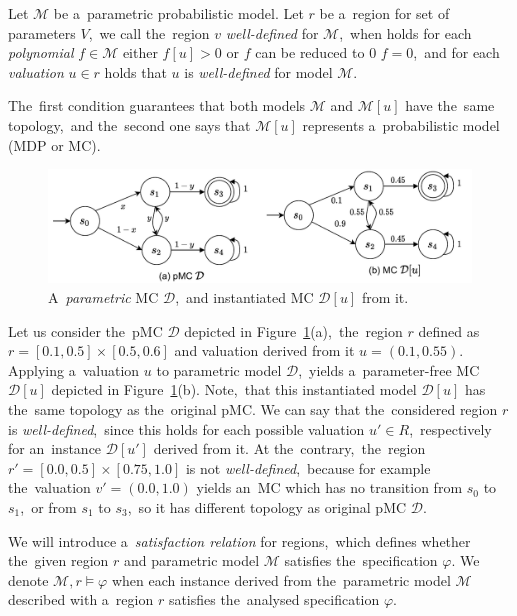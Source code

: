 \begin{definition}
Let $\mathcal{M}$ be a~parametric probabilistic model.
Let $r$ be a~region for set of parameters $V$,~we call the~region $v$ \textit{well-defined} for $\mathcal{M}$,~when holds for each \textit{polynomial} $f \in \mathcal{M}$ either $f[u] > 0$ or  $f$ can be reduced to 0 $f = 0$,~and for each \textit{valuation} $u \in r$ holds that $u$ is \textit{well-defined} for model $\mathcal{M}$.
\end{definition}
\noindent
The~first condition guarantees that both models $\mathcal{M}$ and $\mathcal{M}[u]$ have the~same topology,~and the~second one says that $\mathcal{M}[u]$ represents a~probabilistic model (MDP or MC).

\begin{figure}[h!]
\centering
\includegraphics[width=1.0\textwidth]{figures/param_instance.pdf}
\caption{A~\textit{parametric} MC $\mathcal{D}$,~and instantiated MC $\mathcal{D}[u]$ from it.}%
\label{fig:param_instance}%
\end{figure}

\begin{example}[Region]
Let us consider the~pMC $\mathcal{D}$ depicted in Figure~\ref{fig:param_instance}(a),~the~region $r$ defined as $r = [0.1, 0.5] \times [0.5, 0.6]$ and valuation derived from it $u = (0.1, 0.55)$.
Applying a~valuation $u$ to parametric model $\mathcal{D}$,~yields a~parameter-free MC $\mathcal{D}[u]$ depicted in Figure~\ref{fig:param_instance}(b).
Note,~that this instantiated model $\mathcal{D}[u]$ has the~same topology as the~original pMC.
We can say that the~considered region $r$ is \textit{well-defined},~since this holds for each possible valuation $u' \in R$,~respectively for an~instance $\mathcal{D}[u']$ derived from it.
At the~contrary,~the~region $r' = [0.0, 0.5] \times [0.75, 1.0]$ is not \textit{well-defined},~because for example the~valuation $v' = (0.0, 1.0)$ yields an~MC which has no transition from $s_0$ to $s_1$,~or from $s_1$ to $s_3$,~so it has different topology as original pMC $\mathcal{D}$.
\end{example}

We will introduce a~\textit{satisfaction relation} for regions,~which defines whether the~given region $r$ and parametric model $\mathcal{M}$ satisfies the~specification $\varphi$.
We denote $\mathcal{M}, r \models \varphi$ when each instance derived from the~parametric model $\mathcal{M}$ described with a~region $r$ satisfies the~analysed specification $\varphi$.


